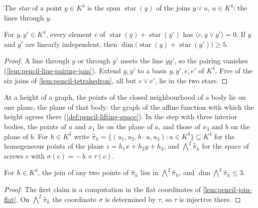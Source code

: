 The \emph{star} of a point $y \in K^4$ is the span
$\operatorname{star}(y)$ of the joins $y \vee u$, $u \in K^4$: the lines
through $y$.

\begin{lemma}
  \label{lem:pencil-two-stars}
  \leanok
  For $y, y' \in K^4$, every element $c$ of
  $\operatorname{star}(y) + \operatorname{star}(y')$ has
  $\langle c, y \vee y' \rangle = 0$. If $y$ and $y'$ are linearly
  independent, then
  $\dim\bigl(\operatorname{star}(y) + \operatorname{star}(y')\bigr) \ge 5$.
\end{lemma}
\begin{proof}
  \leanok
  A line through $y$ or through $y'$ meets the line $y y'$, so the
  pairing vanishes (\cref{lem:pencil-line-pairing-join}). Extend $y, y'$
  to a basis $y, y', e, e'$ of $K^4$. Five of the six joins of
  \cref{lem:pencil-tetrahedron}, all but $e \vee e'$, lie in the two
  stars.
\end{proof}

At a height of a graph, the points of the closed neighbourhood of a body
lie on one plane, the plane of that body: the graph of the affine
function with which the height agrees there
(\cref{def:pencil-lifting-space}). In the step with three interior
bodies, the points of $a$ and $x_1$ lie on the plane of $a$, and those of
$x_3$ and $b$ on the plane of $b$. For $h \in K^3$ write
$\hat\pi_h = \{(u_1, u_2, h \cdot u, u_3) : u \in K^3\} \subseteq K^4$
for the homogeneous points of the plane $z = h_1 x + h_2 y + h_3$, and
$\bigwedge^2 \hat\pi_h$ for the space of screws $c$ with
$\sigma(c) = -\, h \times \tau(c)$.

\begin{lemma}
  \label{lem:pencil-plane-lines}
  \leanok
  For $h \in K^3$, the join of any two points of $\hat\pi_h$ lies in
  $\bigwedge^2 \hat\pi_h$, and $\dim \bigwedge^2 \hat\pi_h \le 3$.
\end{lemma}
\begin{proof}
  \leanok
  The first claim is a computation in the flat coordinates of
  \cref{lem:pencil-join-flat}. On $\bigwedge^2 \hat\pi_h$ the coordinate
  $\sigma$ is determined by $\tau$, so $\tau$ is injective there.
\end{proof}

